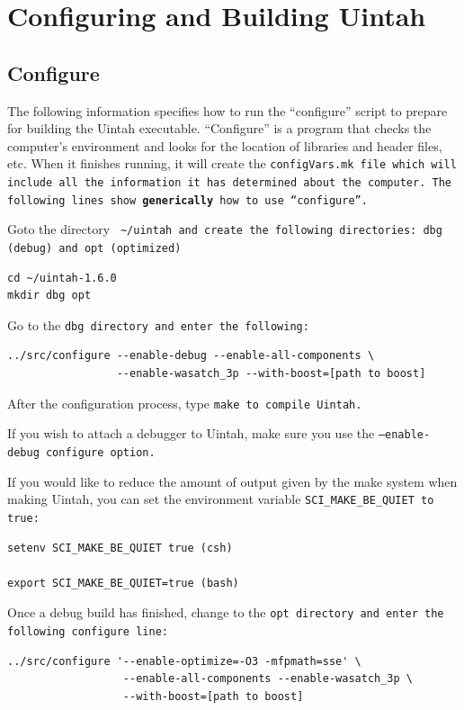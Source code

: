 \documentclass[12pt]{article}
\newcommand{\TT}[1]{\tt{#1} \normalfont}
\begin{document}
\section{Configuring and Building Uintah}

\subsection{Configure}

The following information specifies how to run the ``configure''
script to prepare for building the Uintah executable.  ``Configure''
is a program that checks the computer's environment and looks for the
location of libraries and header files, etc.  When it finishes
running, it will create the \TT{configVars.mk} file which will include
all the information it has determined about the computer.  The
following lines show \textbf{generically} how to use ``configure''.

Goto the directory \TT{ \textasciitilde/uintah} and create the
following directories: \TT{dbg} (debug) and \TT{opt} (optimized)

\begin{verbatim}
cd ~/uintah-1.6.0
mkdir dbg opt
\end{verbatim}

Go to the \TT{dbg} directory and enter the following:

\begin{verbatim}
../src/configure --enable-debug --enable-all-components \
                 --enable-wasatch_3p --with-boost=[path to boost]
\end{verbatim}


After the configuration process, type \TT{make} to compile Uintah.

If you wish to attach a debugger to Uintah, make sure you use the
\TT{--enable-debug} configure option.

If you would like to reduce the amount of output given by the make
system when making Uintah, you can set the environment variable
\TT{SCI\_MAKE\_BE\_QUIET} to true:

\begin{verbatim}
setenv SCI_MAKE_BE_QUIET true (csh)

export SCI_MAKE_BE_QUIET=true (bash)
\end{verbatim}

Once a debug build has finished, change to the \TT{opt} directory and
enter the following configure line:

\begin{verbatim}
../src/configure '--enable-optimize=-O3 -mfpmath=sse' \
                  --enable-all-components --enable-wasatch_3p \
                  --with-boost=[path to boost]
\end{verbatim}
\end{document}
